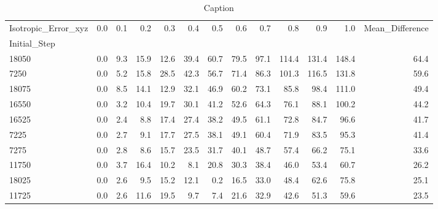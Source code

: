 \documentclass[11pt]{article}
\theoremstyle{definition}
\theoremstyle{definition}
\theoremstyle{definition}
\begin{document}
\begin{table}[]
    \centering
    \begin{tabular}{lrrrrrrrrrrrr}
\toprule
Isotropic\_Error\_xyz & 0.0 & 0.1 & 0.2& 0.3 & 0.4 & 0.5 & 0.6 & 0.7 & 0.8 & 0.9 & 1.0 & Mean\_Difference \\
Initial\_Step &  &  &  &  &  &  &  &  &  &  &  &  \\
\midrule
18050 & 0.0 & 9.3 & 15.9 & 12.6 & 39.4 & 60.7 & 79.5 & 97.1 & 114.4 & 131.4 & 148.4 & 64.4 \\
7250 & 0.0 & 5.2 & 15.8 & 28.5 & 42.3 & 56.7 & 71.4 & 86.3 & 101.3 & 116.5 & 131.8 & 59.6 \\
18075 & 0.0 & 8.5 & 14.1 & 12.9 & 32.1 & 46.9 & 60.2 & 73.1 & 85.8 & 98.4 & 111.0 & 49.4 \\
16550 & 0.0 & 3.2 & 10.4 & 19.7 & 30.1 & 41.2 & 52.6 & 64.3 & 76.1 & 88.1 & 100.2 & 44.2 \\
16525 & 0.0 & 2.4 & 8.8 & 17.4 & 27.4 & 38.2 & 49.5 & 61.1 & 72.8 & 84.7 & 96.6 & 41.7 \\
7225 & 0.0 & 2.7 & 9.1 & 17.7 & 27.5 & 38.1 & 49.1 & 60.4 & 71.9 & 83.5 & 95.3 & 41.4 \\
7275 & 0.0 & 2.8 & 8.6 & 15.7 & 23.5 & 31.7 & 40.1 & 48.7 & 57.4 & 66.2 & 75.1 & 33.6 \\
11750 & 0.0 & 3.7 & 16.4 & 10.2 & 8.1 & 20.8 & 30.3 & 38.4 & 46.0 & 53.4 & 60.7 & 26.2 \\
18025 & 0.0 & 2.6 & 9.5 & 15.2 & 12.1 & 0.2 & 16.5 & 33.0 & 48.4 & 62.6 & 75.8 & 25.1 \\
11725 & 0.0 & 2.6 & 11.6 & 19.5 & 9.7 & 7.4 & 21.6 & 32.9 & 42.6 & 51.3 & 59.6 & 23.5 \\
\bottomrule
\end{tabular}
    \caption{Caption}
    \label{tab:my_label}
\end{table}

\end{document}
